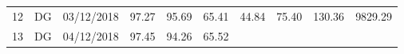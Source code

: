 \documentclass[
  11pt,
]{article}
\begin{document}
\begin{longtable}[]{@{}llllllllll@{}}
\begin{minipage}[t]{0.04\columnwidth}\raggedright
12\strut
\end{minipage} & \begin{minipage}[t]{0.09\columnwidth}\raggedright
DG\strut
\end{minipage} & \begin{minipage}[t]{0.10\columnwidth}\raggedright
03/12/2018\strut
\end{minipage} & \begin{minipage}[t]{0.06\columnwidth}\raggedright
97.27\strut
\end{minipage} & \begin{minipage}[t]{0.06\columnwidth}\raggedright
95.69\strut
\end{minipage} & \begin{minipage}[t]{0.06\columnwidth}\raggedright
65.41\strut
\end{minipage} & \begin{minipage}[t]{0.06\columnwidth}\raggedright
44.84\strut
\end{minipage} & \begin{minipage}[t]{0.06\columnwidth}\raggedright
75.40\strut
\end{minipage} & \begin{minipage}[t]{0.13\columnwidth}\raggedright
130.36\strut
\end{minipage} & \begin{minipage}[t]{0.08\columnwidth}\raggedright
9829.29\strut
\end{minipage}\tabularnewline
\begin{minipage}[t]{0.04\columnwidth}\raggedright
13\strut
\end{minipage} & \begin{minipage}[t]{0.09\columnwidth}\raggedright
DG\strut
\end{minipage} & \begin{minipage}[t]{0.10\columnwidth}\raggedright
04/12/2018\strut
\end{minipage} & \begin{minipage}[t]{0.06\columnwidth}\raggedright
97.45\strut
\end{minipage} & \begin{minipage}[t]{0.06\columnwidth}\raggedright
94.26\strut
\end{minipage} & \begin{minipage}[t]{0.06\columnwidth}\raggedright
65.52\strut
\end{minipage} & \begin{minipage}[t]{0.06\columnwidth}\raggedright

\end{minipage}
\end{longtable}
\end{document}
